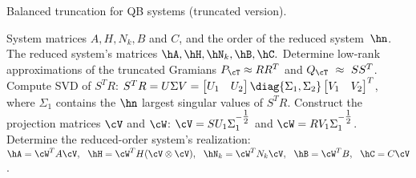 %	
%	
%	
\begin{algorithm}[!tb]
	\caption{Balanced truncation for QB systems (truncated version).}
	\begin{algorithmic}[1]
		 System matrices $ A, H,N_k, B$ and $C$, and the order of the reduced system~$\hn$.
		 The reduced system's matrices  $\hA, \hH,\hN_k,\hB, \hC.$
		\State Determine low-rank approximations of the truncated Gramians $P_\cT\approx RR^T$ and $Q_\cT~\approx~SS^T$.
		\State Compute SVD of $S ^TR$:
		\Statex \qquad $S^TR = U\Sigma V = \bbm U_1 & U_2\ebm \diag{ \Sigma_1,\Sigma_2}\bbm V_1 & V_{2}\ebm^T$,
		\Statex\qquad     where $\Sigma_1$ contains the $\hn$ largest singular values of $S^TR$.
		\State Construct the projection matrices $\cV$  and $\cW$:
		\Statex \qquad $\cV = S U_1\Sigma_1^{-\tfrac{1}{2}}$ and $\cW = R V_1\Sigma_1^{-\tfrac{1}{2}}$.
		\State Determine the reduced-order system's realization:
		\Statex \qquad$\hA = \cW^TA\cV,~~\hH =\cW^T H(\cV\otimes \cV),~~\hN_k = \cW^TN_k\cV,~~ \hB = \cW^TB,~~\hC = C\cV $.
	\end{algorithmic}\label{algo:BT_qbdae}
\end{algorithm}

